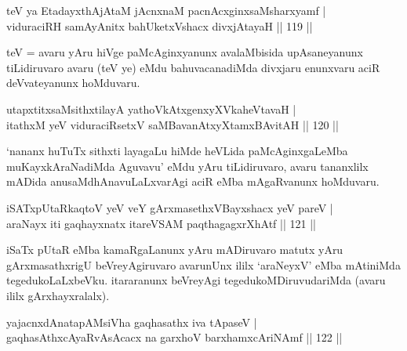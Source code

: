 

\begin{shl}
teV ya EtadayxthAjAtaM jAcnxnaM pacnAcxginxsaMsharxyamf | \\
viduraciRH samAyAnitx bahUketxVshacx divxjAtayaH \hfill|| 119 || 
\end{shl}

\begin{artha}
teV = avaru yAru hiVge paMcAginxyanunx avalaMbisida upAsaneyanunx
tiLidiruvaro avaru (teV ye) eMdu bahuvacanadiMda divxjaru enunxvaru
aciR deVvateyanunx hoMduvaru.
\end{artha}

\begin{shl}
utapxtitxsaMsithxtilayA yathoVkAtxgenxyXVkaheVtavaH | \\
itathxM yeV viduraciRsetxV saMBavanAtxyXtamxBAvitAH \hfill|| 120 || 
\end{shl}

\begin{artha}
`nananx huTuTx sithxti layagaLu hiMde heVLida paMcAginxgaLeMba
muKayxkAraNadiMda Aguvavu' eMdu yAru tiLidiruvaro, avaru tananxlilx
mADida anusaMdhAnavuLaLxvarAgi aciR eMba mAgaRvanunx hoMduvaru.
\end{artha}


\begin{shl}
iSATxpUtaRkaqtoV yeV veY gArxmasethxVBayxshacx yeV pareV | \\
araNayx iti gaqhayxnatx itareVSAM paqthagagxrXhAtf \hfill|| 121 || 
\end{shl}

\begin{artha}
iSaTx pUtaR eMba kamaRgaLanunx yAru mADiruvaro
matutx yAru gArxmasathxrigU beVreyAgiruvaro avarunUnx ililx `araNeyxV' eMba
mAtiniMda tegedukoLaLxbeVku. itararanunx beVreyAgi
tegedukoMDiruvudariMda (avaru ililx gArxhayxralalx).
\end{artha}


\begin{shl}
yajacnxdAnatapAMsiVha gaqhasathx iva tApaseV | \\
gaqhasAthxcAyaRvAsAcacx na garxhoV barxhamxcAriNAmf \hfill|| 122 || 
\end{shl}

